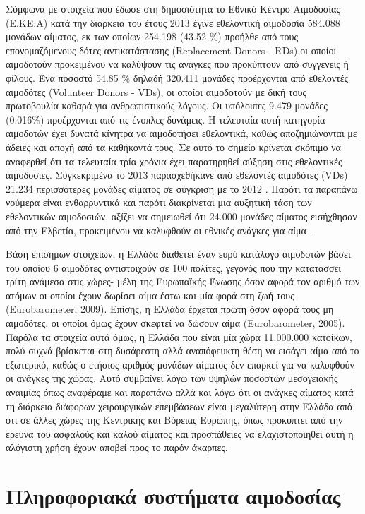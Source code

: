 		Σύμφωνα με στοιχεία που έδωσε στη δημοσιότητα το Εθνικό Κέντρο Αιμοδοσίας (Ε.ΚΕ.Α) κατά την διάρκεια του έτους 2013 έγινε εθελοντική αιμοδοσία 584.088 μονάδων αίματος, εκ των οποίων 254.198 (43.52 \%) προήλθε από τους επονομαζόμενους δότες αντικατάστασης (Replacement Donors - RDs),οι οποίοι αιμοδοτούν προκειμένου να καλύψουν τις ανάγκες που προκύπτουν από συγγενείς ή φίλους. Ένα ποσοστό 54.85 \% δηλαδή 320.411 μονάδες προέρχονται από εθελοντές αιμοδότες (Volunteer Donors - VDs), οι οποίοι αιμοδοτούν με δική τους πρωτοβουλία καθαρά για ανθρωπιστικούς λόγους. Οι υπόλοιπες 9.479 μονάδες (0.016\%) προέρχονται από τις ένοπλες δυνάμεις. Η τελευταία αυτή κατηγορία αιμοδοτών έχει δυνατά κίνητρα να αιμοδοτήσει εθελοντικά, καθώς αποζημιώνονται με άδειες και αποχή από τα καθήκοντά τους. Σε αυτό το σημείο κρίνεται σκόπιμο να αναφερθεί ότι τα τελευταία τρία χρόνια έχει παρατηρηθεί αύξηση στις εθελοντικές αιμοδοσίες. Συγκεκριμένα το 2013 παρασχεθήκανε από εθελοντές αιμοδότες (VDs) 21.234 περισσότερες μονάδες αίματος σε σύγκριση με το 2012 \cite{EKEA}. Παρότι τα παραπάνω νούμερα είναι ενθαρρυντικά και παρότι διακρίνεται μια αυξητική τάση των εθελοντικών αιμοδοσιών, αξίζει να σημειωθεί ότι 24.000 μονάδες αίματος εισήχθησαν από την Ελβετία, προκειμένου να καλυφθούν οι εθνικές ανάγκες για αίμα \cite{Marantidou2007}.
		
		Βάση επίσημων στοιχείων, η Ελλάδα διαθέτει έναν ευρύ κατάλογο αιμοδοτών βάσει του οποίου 6 αιμοδότες αντιστοιχούν σε 100 πολίτες, γεγονός που την κατατάσσει τρίτη ανάμεσα στις χώρες- μέλη της Ευρωπαϊκής Ένωσης όσον αφορά τον αριθμό των ατόμων οι οποίοι έχουν δωρίσει αίμα έστω και μία φορά στη ζωή τους  (Eurobarometer, 2009).  Επίσης, η Ελλάδα έρχεται πρώτη όσον αφορά τους μη αιμοδότες, οι οποίοι όμως έχουν σκεφτεί να δώσουν αίμα (Eurobarometer, 2005). Παρόλα τα στοιχεία αυτά όμως, η Ελλάδα που είναι μία χώρα 11.000.000 κατοίκων, πολύ συχνά βρίσκεται στη δυσάρεστη αλλά αναπόφευκτη θέση να εισάγει αίμα από το εξωτερικό, καθώς ο ετήσιος αριθμός μονάδων αίματος δεν επαρκεί για να καλυφθούν οι ανάγκες της χώρας. Αυτό συμβαίνει λόγω των υψηλών ποσοστών μεσογειακής αναιμίας όπως αναφέραμε και παραπάνω αλλά και λόγω ότι οι ανάγκες αίματος κατά τη διάρκεια διάφορων χειρουργικών επεμβάσεων είναι μεγαλύτερη στην Ελλάδα από ότι σε άλλες χώρες της Κεντρικής και Βόρειας Ευρώπης, όπως προκύπτει από την έρευνα του ασφαλούς και
καλού αίματος \cite{Grindon1996} και προσπάθειες να ελαχιστοποιηθεί αυτή η αλόγιστη χρήση έχουν αποβεί προς το παρόν άκαρπες. 


\section{Πληροφοριακά συστήματα αιμοδοσίας}
